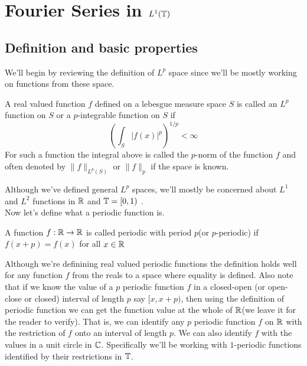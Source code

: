 \chapter{Fourier Series in $L^1(\mathbb T)$}

  \section{Definition and basic properties}

    We'll begin by reviewing the definition of $L^p$ space since we'll be mostly working on functions from these space.
  \begin{definition}[$L^p$ function]
    \label{def:Lp_function}
    A real valued function $f$ defined on a lebesgue measure space $S$ is called an $L^p$ function on $S$ or a $p$-integrable function on $S$ if 
    \begin{displaymath}
       \left( \int_{S} |f(x)|^p \right)^{1/p} < \infty
    \end{displaymath}
    For such a function the integral above is called the $p$-norm of the function $f$ and often denoted by $\|f\|_{L^p(S)}$ or $\|f\|_p$ if the space is known.
\end{definition}  
  Although we've defined general $L^p$ spaces, we'll mostly be concerned about $L^1$ and $L^2$ functions in $\mathbb R$ and $\mathbb T = [0, 1)$ .
  \\

  Now let's define what a periodic function is.
  \begin{definition}
    \label{def:periodic_function}
    A function $f:\mathbb R \to \mathbb R$ is called periodic with period $p$(or $p$-periodic) if $f(x+p) = f(x)$ for all $x \in \mathbb R$

  \end{definition}
  Although we're definining real valued periodic functions the definition holds well for any function $f$ from the reals to a space where equality is defined.
  Also note that if we know the value of a $p$ periodic function $f$ in a closed-open (or open-close or closed) interval of length $p$ say $[x, x+p)$, then using the definition of periodic function we can get the function value at the whole of $\mathbb R$(we leave it for the reader to verify). That is, we can identify any $p$ periodic function $f$ on $\mathbb R$ with the restriction of $f$ onto an interval of length $p$. We can also identify $f$ with the values in a unit circle in $\mathbb C$.
  Specifically we'll be working with $1$-periodic functions identified by their restrictions in $\mathbb T$.
\\

